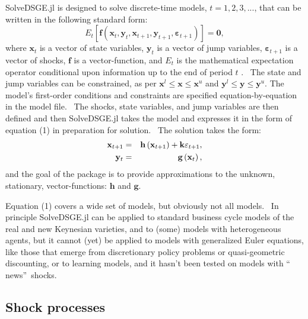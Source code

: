 \documentclass[notitlepage,11pt]{article}
\begin{document}
SolveDSGE.jl is designed to solve discrete-time models, $t=1,2,3,...$, that
can be written in the following standard form:%
\begin{equation}
E_{t}\left[ \mathbf{f}\left( \mathbf{x}_{t},\mathbf{y}_{t},\mathbf{x}_{t+1},%
\mathbf{y}_{t+1},\mathbf{\varepsilon }_{t+1}\right) \right] =\mathbf{0},
\label{1}
\end{equation}%
where $\mathbf{x}_{t}$ is a vector of state variables, $\mathbf{y}_{t}$ is a
vector of jump variables, $\mathbf{\varepsilon }_{t+1}$ is a vector of
shocks, $\mathbf{f}$ is a vector-function, and $E_{t}$ is the mathematical
expectation operator conditional upon information up to the end of period $t$%
. \ The state and jump variables can be constrained, as per $\mathbf{x}%
^{l}\leq \mathbf{x}\leq \mathbf{x}^{u}$ and $\mathbf{y}^{l}\leq \mathbf{y}%
\leq \mathbf{y}^{u}$. The model's first-order conditions and constraints are
specified equation-by-equation in the model file. \ The shocks, state
variables, and jump variables are then defined and then SolveDSGE.jl takes
the model and expresses it in the form of equation (1) in preparation for
solution. \ The solution takes the form:%
\begin{eqnarray}
\mathbf{x}_{t+1} &=&\mathbf{h}\left( \mathbf{x}_{t+1}\right) +\mathbf{%
k\varepsilon }_{t+1},  \label{2} \\
\mathbf{y}_{t} &=&\mathbf{g}\left( \mathbf{x}_{t}\right) ,  \label{3}
\end{eqnarray}%
and the goal of the package is to provide approximations to the unknown,
stationary, vector-functions: $\mathbf{h}$ and $\mathbf{g}$.

Equation (1) covers a wide set of models, but obviously not all models. \ In
principle SolveDSGE.jl can be applied to standard business cycle models of
the real and new Keynesian varieties, and to (some) models with
heterogeneous agents, but it cannot (yet) be applied to models with
generalized Euler equations, like those that emerge from discretionary
policy problems or quasi-geometric discounting, or to learning models, and
it hasn't been tested on models with \textquotedblleft
news\textquotedblright\ shocks.

\subsection{Shock processes}
\end{document}
